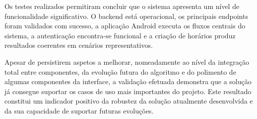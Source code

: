Os testes realizados permitiram concluir que o sistema apresenta um nível de funcionalidade significativo. O backend está operacional, os principais endpoints foram validados com sucesso, a aplicação Android executa os fluxos centrais do sistema, a autenticação encontra-se funcional e a criação de horários produz resultados coerentes em cenários representativos.

Apesar de persistirem aspetos a melhorar, nomeadamente ao nível da integração total entre componentes, da evolução futura do algoritmo e do polimento de algumas componentes da interface, a validação efetuada demonstra que a solução
já consegue suportar os casos de uso mais importantes do projeto.
Este resultado constitui um indicador positivo da robustez da solução atualmente desenvolvida e da sua capacidade de suportar futuras evoluções.